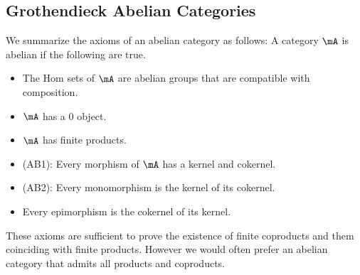 \documentclass[a4paper]{article}
\begin{document}
\subsection{Grothendieck Abelian Categories}
We summarize the axioms of an abelian category as follows: A category $\mA$ is abelian if the following are true. 
\begin{itemize}
\item The Hom sets of $\mA$ are abelian groups that are compatible with composition. 
\item $\mA$ has a $0$ object. 
\item $\mA$ has finite products. 
\item (AB1): Every morphism of $\mA$ has a kernel and cokernel. 
\item (AB2): Every monomorphism is the kernel of its cokernel. 
\item Every epimorphism is the cokernel of its kernel. 
\end{itemize}
These axioms are sufficient to prove the existence of finite coproducts and them coinciding with finite products. However we would often prefer an abelian category that admits all products and coproducts. 
\end{document}
